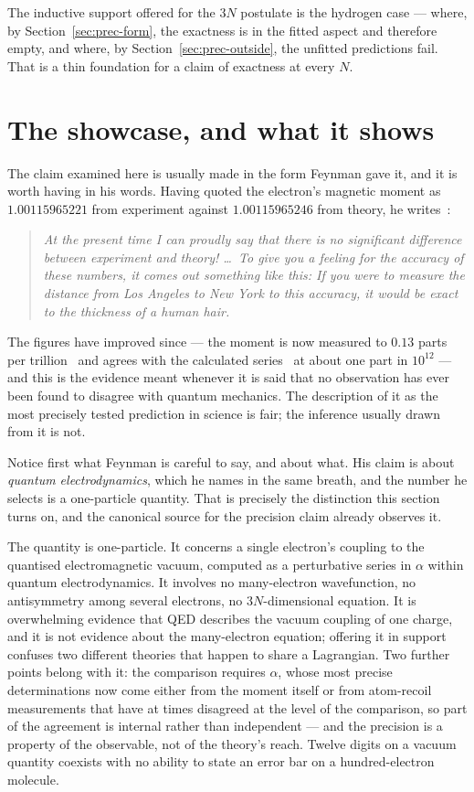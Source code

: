 The inductive support offered for the $3N$ postulate is the hydrogen case --- where, by
Section~\ref{sec:prec-form}, the exactness is in the fitted aspect and therefore empty, and where,
by Section~\ref{sec:prec-outside}, the unfitted predictions fail. That is a thin foundation for a
claim of exactness at every $N$.

\section{The showcase, and what it shows}\label{sec:prec-ae}

The claim examined here is usually made in the form Feynman gave it, and it is worth having in his
words. Having quoted the electron's magnetic moment as $1.00115965221$ from experiment against
$1.00115965246$ from theory, he writes~\cite[ch.~1]{FeynmanQED}:
\begin{quote}
\itshape At the present time I can proudly say that there is no significant difference between
experiment and theory! \dots\ To give you a feeling for the accuracy of these numbers, it comes out
something like this: If you were to measure the distance from Los Angeles to New York to this
accuracy, it would be exact to the thickness of a human hair.
\end{quote}
The figures have improved since --- the moment is now measured to $0.13$ parts per
trillion~\cite{Fan2023} and agrees with the calculated series~\cite{Aoyama2019} at about one part
in $10^{12}$ --- and this is the evidence meant whenever it is said that no observation has ever
been found to disagree with quantum mechanics. The description of it as the most precisely tested
prediction in science is fair; the inference usually drawn from it is not.

Notice first what Feynman is careful to say, and about what. His claim is about \emph{quantum
electrodynamics}, which he names in the same breath, and the number he selects is a one-particle
quantity. That is precisely the distinction this section turns on, and the canonical source for the
precision claim already observes it.

The quantity is one-particle. It concerns a single electron's coupling to the quantised
electromagnetic vacuum, computed as a perturbative series in $\alpha$ within quantum
electrodynamics. It involves no many-electron wavefunction, no antisymmetry among several
electrons, no $3N$-dimensional equation. It is overwhelming evidence that QED describes the vacuum
coupling of one charge, and it is not evidence about the many-electron equation; offering it in
support confuses two different theories that happen to share a Lagrangian. Two further points
belong with it: the comparison requires $\alpha$, whose most precise determinations now come either
from the moment itself or from atom-recoil measurements that have at times disagreed at the level
of the comparison, so part of the agreement is internal rather than independent --- and the
precision is a property of the observable, not of the theory's reach. Twelve digits on a vacuum
quantity coexists with no ability to state an error bar on a hundred-electron molecule.

